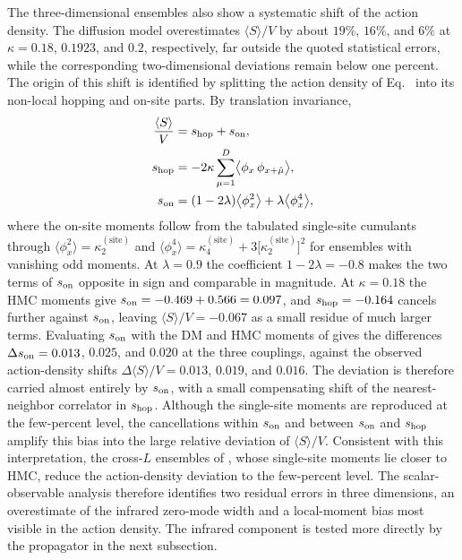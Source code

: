 \documentclass[reprint,twocolumn,superscriptaddress,preprintnumbers,amsmath,amssymb,aps,prd,floatfix]{revtex4-2}
\def\Eq#1{Eq.~\labelcref{#1}} \def\Eqs#1{Eqs.~\labelcref{#1}}
\begin{document}
The three-dimensional ensembles also show a systematic shift of the action density. The diffusion model overestimates $\langle S\rangle/V$ by about $19\%$, $16\%$, and $6\%$ at $\kappa=0.18$, $0.1923$, and $0.2$, respectively, far outside the quoted statistical errors, while the corresponding two-dimensional deviations remain below one percent. The origin of this shift is identified by splitting the action density of \Eq{eq:phi4_action} into its non-local hopping and on-site parts. By translation invariance,
\begin{equation}
\begin{aligned}
\frac{\langle S\rangle}{V} &= s_{\rm hop}+s_{\rm on},\\
s_{\rm hop} &= -2\kappa\sum_{\mu=1}^{D}\bigl\langle\phi_x\,\phi_{x+\hat\mu}\bigr\rangle,\\
s_{\rm on} &= (1-2\lambda)\bigl\langle\phi_x^2\bigr\rangle+\lambda\bigl\langle\phi_x^4\bigr\rangle,
\end{aligned}
\label{eq:action_density_split}
\end{equation}
where the on-site moments follow from the tabulated single-site cumulants through $\langle\phi_x^2\rangle=\kappa^{(\mathrm{site})}_2$ and $\langle\phi_x^4\rangle=\kappa^{(\mathrm{site})}_4+3\bigl[\kappa^{(\mathrm{site})}_2\bigr]^2$ for ensembles with vanishing odd moments. At $\lambda=0.9$ the coefficient $1-2\lambda=-0.8$ makes the two terms of $s_{\rm on}$ opposite in sign and comparable in magnitude. At $\kappa=0.18$ the HMC moments give $s_{\rm on}=-0.469+0.566=0.097$, and $s_{\rm hop}=-0.164$ cancels further against $s_{\rm on}$, leaving $\langle S\rangle/V=-0.067$ as a small residue of much larger terms. Evaluating $s_{\rm on}$ with the DM and HMC moments of  gives the differences $\Delta s_{\rm on}=0.013$, $0.025$, and $0.020$ at the three couplings, against the observed action-density shifts $\Delta\langle S\rangle/V=0.013$, $0.019$, and $0.016$. The deviation is therefore carried almost entirely by $s_{\rm on}$, with a small compensating shift of the nearest-neighbor correlator in $s_{\rm hop}$. Although the single-site moments are reproduced at the few-percent level, the cancellations within $s_{\rm on}$ and between $s_{\rm on}$ and $s_{\rm hop}$ amplify this bias into the large relative deviation of $\langle S\rangle/V$. Consistent with this interpretation, the cross-$L$ ensembles of , whose single-site moments lie closer to HMC, reduce the action-density deviation to the few-percent level. The scalar-observable analysis therefore identifies two residual errors in three dimensions, an overestimate of the infrared zero-mode width and a local-moment bias most visible in the action density. The infrared component is tested more directly by the propagator in the next subsection.
\end{document}
